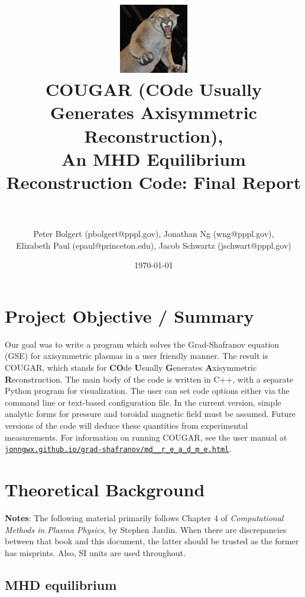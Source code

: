 \documentclass[paper=letter, fontsize=11pt]{scrartcl} %
\title{	
\includegraphics[width=3cm]{Cougar_Nevada}
\normalfont \normalsize 
\horrule{0.5pt} \\[0.4cm] %
\LARGE COUGAR (\textbf{CO}de \textbf{U}sually \textbf{G}enerates \textbf{A}xisymmetric \textbf{R}econstruction), \\ \Large An MHD Equilibrium Reconstruction Code: Final Report\\ %
\horrule{2pt} \\[0.5cm] %
}
\author{Peter Bolgert (pbolgert@pppl.gov), Jonathan Ng (wng@pppl.gov), \\ Elizabeth Paul (epaul@princeton.edu), Jacob Schwartz (jschwart@pppl.gov)} %
\date{\normalsize\today} %
\begin{document}
\maketitle %


\section{Project Objective / Summary}

Our goal was to write a program which solves the Grad-Shafranov equation (GSE) for axisymmetric plasmas in a user friendly manner.  The result is COUGAR, which stands for \textbf{CO}de \textbf{U}sually \textbf{G}enerates \textbf{A}xisymmetric \textbf{R}econstruction.  The main body of the code is written in C++, with a separate Python program for visualization.  The user can set code options either via the command line or text-based configuration file.  In the current version, simple analytic forms for pressure and toroidal magnetic field must be assumed.  Future versions of the code will deduce these quantities from experimental measurements.  For information on running COUGAR, see the user manual at \href{http://jonngwx.github.io/grad-shafranov/md__r_e_a_d_m_e.html}{\nolinkurl{jonngwx.github.io/grad-shafranov/md__r_e_a_d_m_e.html}}.


\section{Theoretical Background}

\textbf{Notes}: The following material primarily follows Chapter 4 of \textit{Computational Methods in Plasma Physics}, by Stephen Jardin.  When there are discrepancies between that book and this document, the latter should be trusted as the former has misprints.  Also, SI units are used throughout.

\subsection{MHD equilibrium}
\end{document}
